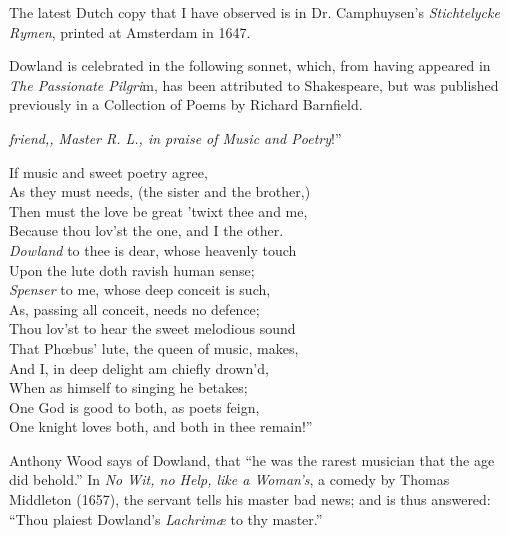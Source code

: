 The latest Dutch copy that I have observed is in Dr. Camphuysen’s \textit{Stichtelycke
Rymen}, printed at Amsterdam in 1647.

Dowland is celebrated in the following sonnet, which, from having appeared in
\textit{The Passionate Pilgri}m, has been attributed to Shakespeare, but was published
previously in a Collection of Poems by Richard Barnfield.
\pagebreak

\settowidth{\versewidth}{One knight loves both, and both in thee remain!}
\begin{scverse}\textit{ friend,, Master R. L., in praise of Music and Poetry}!”\\
\begin{patverse}
If music and sweet poetry agree,\\
As they must needs, (the sister and the brother,)\\
Then must the love be great ’twixt thee and me,\\
Because thou lov’st the one, and I the other.\\
\textit{Dowland} to thee is dear, whose heavenly touch\\
Upon the lute doth ravish human sense;\\
\textit{Spenser} to me, whose deep conceit is such,\\
As, passing all conceit, needs no defence;\\
Thou lov’st to hear the sweet melodious sound\\
That Phœbus’ lute, the queen of music, makes,\\
And I, in deep delight am chiefly drown’d,\\
When as himself to singing he betakes;\\
One God is good to both, as poets feign,\\
One knight loves both, and both in thee remain!”
\end{patverse}
\end{scverse}

Anthony Wood says of Dowland, that “he was the rarest musician that the
age did behold.” In \textit{No Wit, no Help, like a Woman’s}, a comedy by Thomas
Middleton (1657), the servant tells his master bad news; and is thus answered:
“Thou plaiest Dowland’s \textit{Lachrimæ} to thy master.”

